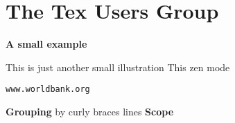 \documentclass{article}
\newcommand{\TUG}{Tex Users Group}
\newcommand{\keyword}[1]{\textbf{#1}}
\begin{document}
\section{The \TUG}

\begin{huge}
\bfseries
A small example
\end{huge}


\bigskip
This is just another small illustration
This zen mode

\texttt{www.worldbank.org}

\keyword{Grouping} by curly braces lines
\keyword{Scope}
\end{document}
